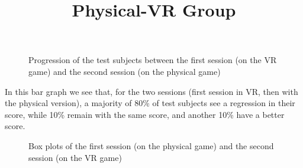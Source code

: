 \documentclass[12pt, openany, twocolumn]{article}
\begin{document}
                \begin{figure}[H]
                    \setlength{\fboxsep}{0pt}
                    \setlength{\fboxrule}{1pt}
                    \caption{Progression of the test subjects between the first session (on the VR game) and the second session (on the physical game)}
                \end{figure}

            In this bar graph we see that, for the two sessions (first session in VR, then with the physical version), a majority of 80\% of test subjects see a regression in their score, while 10\% remain with the same score, and another 10\% have a better score.
            \\

            \noindent \title{\textbf{Physical-VR Group}}          
                \begin{figure}[H]
                    \setlength{\fboxsep}{0pt}
                    \setlength{\fboxrule}{1pt}
                    \caption{Box plots of the first session (on the physical game) and the second session (on the VR game)}
                \end{figure}
            
\end{document}
